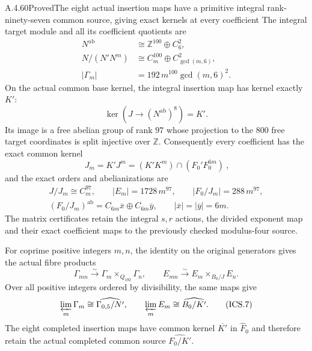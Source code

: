 \begin{result}{A.4.60}{Proved}{The eight actual insertion maps have a primitive integral rank-ninety-seven common source, giving exact kernels at every coefficient}
The integral target module and all its coefficient quotients are
\[
 \begin{aligned}
 N^{\mathrm{ab}}&\cong\mathbb Z^{100}\oplus C_6^2,\\
 N/(N'N^m)&\cong C_m^{100}\oplus C_{\gcd(m,6)}^2,\\
 |\Gamma_m|&=192\,m^{100}\gcd(m,6)^2.
 \end{aligned}                                            \tag{ICS.2}
\]
On the actual common base kernel, the integral insertion map has
kernel exactly $K'$:
\[
 \ker\left(J\longrightarrow (N^{\mathrm{ab}})^8\right)=K'.
                                                        \tag{ICS.3}
\]
Its image is a free abelian group of rank $97$ whose projection to the
$800$ free target coordinates is split injective over $\mathbb Z$.
Consequently every coefficient has the exact common kernel
\[
 \boxed{\ J_m=K'J^m=(K'K^m)\cap(F_0'F_0^{6m})\ },
                                                        \tag{ICS.4}
\]
and the exact orders and abelianizations are
\[
 \begin{gathered}
 J/J_m\cong C_m^{97},\qquad |E_m|=1728\,m^{97},\qquad
 |F_0/J_m|=288\,m^{97},\\
 (F_0/J_m)^{\mathrm{ab}}=C_{6m}\overline x\oplus
                         C_{6m}\overline y,\qquad
 |\overline x|=|\overline y|=6m.
 \end{gathered}                                            \tag{ICS.5}
\]
The matrix certificates retain the integral $s,r$ actions, the
divided exponent map and their exact coefficient maps to the
previously checked modulus-four source.

For coprime positive integers $m,n$, the identity on the original
generators gives the actual fibre products
\[
 \Gamma_{mn}\xrightarrow{\sim}
       \Gamma_m\mathbin{\times}_{Q_{192}}\Gamma_n,
 \qquad
 E_{mn}\xrightarrow{\sim}
       E_m\mathbin{\times}_{B_0/J}E_n.
                                                        \tag{ICS.6}
\]
Over all positive integers ordered by divisibility, the same maps give
\[
 \varprojlim_m\Gamma_m
      \cong\widehat{\Gamma_{0,5}/N'},\qquad
 \varprojlim_m E_m\cong\widehat{B_0/K'}.
                                                        \tag{ICS.7}
\]
The eight completed insertion maps have common kernel
$\overline{K'}$ in $\widehat F_0$ and therefore retain the
actual completed common source $\widehat{F_0/K'}$.
\end{result}


